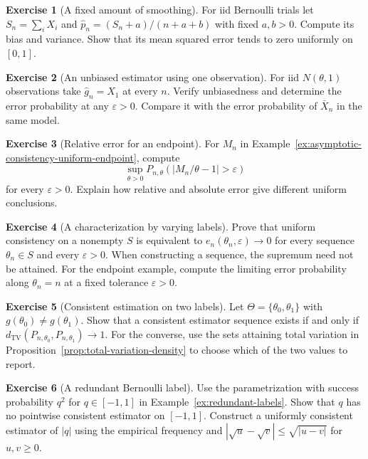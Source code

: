 \documentclass[11pt,oneside]{book}
\theoremstyle{definition}
\newtheorem{exercise}{Exercise}[section]
\theoremstyle{remark}
\begin{document}
\begin{exercise}[A fixed amount of smoothing]
\label{exer:asymptotic-consistency-bernoulli-smoothing}
For iid Bernoulli trials let $S_n=\sum_i X_i$ and
$\widehat p_n=(S_n+a)/(n+a+b)$ with fixed $a,b>0$.
Compute its bias and variance. Show that its mean squared error
tends to zero uniformly on $[0,1]$.
\end{exercise}

\begin{exercise}[An unbiased estimator using one observation]
\label{exer:asymptotic-consistency-unbiased-one}
For iid $N(\theta,1)$ observations take $\widehat g_n=X_1$
at every $n$. Verify unbiasedness and determine the error
probability at any $\varepsilon>0$. Compare it with the error
probability of $\bar X_n$ in the same model.
\end{exercise}

\begin{exercise}[Relative error for an endpoint]
\label{exer:asymptotic-consistency-endpoint-relative}
For $M_n$ in Example~\ref{ex:asymptotic-consistency-uniform-endpoint},
compute
\[
\sup_{\theta>0}P_{n,\theta}(|M_n/\theta-1|>\varepsilon)
\]
for every $\varepsilon>0$. Explain how relative and absolute
error give different uniform conclusions.
\end{exercise}

\begin{exercise}[A characterization by varying labels]
\label{exer:asymptotic-consistency-varying-labels}
Prove that uniform consistency on a nonempty $S$ is equivalent
to $e_n(\theta_n,\varepsilon)\to0$ for every sequence
$\theta_n\in S$ and every $\varepsilon>0$. When constructing a
sequence, the supremum need not be attained. For the endpoint
example, compute the limiting error probability along $\theta_n=n$
at a fixed tolerance $\varepsilon>0$.
\end{exercise}

\begin{exercise}[Consistent estimation on two labels]
\label{exer:asymptotic-consistency-two-labels}
Let $\Theta=\{\theta_0,\theta_1\}$ with $g(\theta_0)\ne g(\theta_1)$.
Show that a consistent estimator sequence exists if and only if
$d_{\mathrm{TV}}(P_{n,\theta_0},P_{n,\theta_1})\to1$. For the
converse, use the sets attaining total variation in
Proposition~\ref{prop:total-variation-density} to choose which
of the two values to report.
\end{exercise}

\begin{exercise}[A redundant Bernoulli label]
\label{exer:asymptotic-consistency-redundant-bernoulli}
Use the parametrization with success probability $q^2$ for
$q\in[-1,1]$ in Example~\ref{ex:redundant-labels}.
Show that $q$ has no pointwise consistent estimator on $[-1,1]$.
Construct a uniformly consistent estimator of $|q|$ using the
empirical frequency and $|\sqrt u-\sqrt v|\leq\sqrt{|u-v|}$
for $u,v\geq0$.
\end{exercise}
\end{document}
